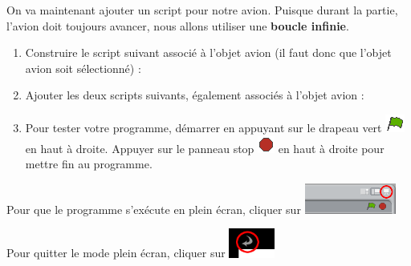 On va maintenant ajouter un script pour notre avion. Puisque durant la partie, l'avion doit toujours avancer, nous allons utiliser une \textbf{boucle infinie}.

\vspace{12pt}


\vspace{12pt}



\begin{enumerate}
\item Construire le script suivant associé à l'objet avion (il faut donc que l'objet avion soit sélectionné) :
\item Ajouter les deux scripts suivants, également associés à l'objet avion :
\item Pour tester votre programme, démarrer en appuyant sur le drapeau vert \includegraphics[width=.7cm]{./images/scratch/DrapeauVert} en haut à droite. Appuyer sur le panneau stop \includegraphics[width=.7cm]{./images/scratch/Stop} en haut à droite pour mettre fin au programme.
\end{enumerate}

Pour que le programme s'exécute en plein écran, cliquer sur \includegraphics[width=3cm]{./images/scratch/ScratchPleinEcran}

Pour quitter le mode plein écran, cliquer sur \includegraphics[width=1.5cm]{./images/scratch/ScratchQuitterPleinEcran}



